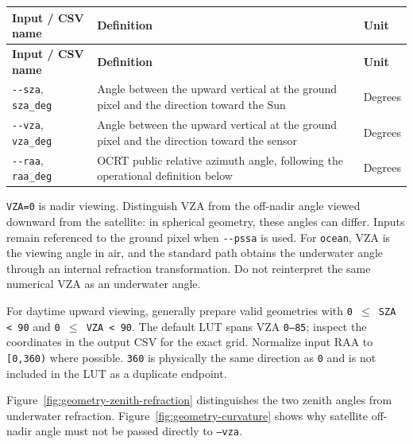 {\TableFont
\begin{longtable}{@{}>{\raggedright\arraybackslash}p{}>{\raggedright\arraybackslash}p{}>{\raggedright\arraybackslash}p{}@{}}
\toprule
\textbf{Input / CSV name} & \textbf{Definition} & \textbf{Unit} \\
\midrule
\endfirsthead
\toprule
\textbf{Input / CSV name} & \textbf{Definition} & \textbf{Unit} \\
\midrule
\endhead
\bottomrule
\endfoot
\texttt{-\allowbreak{}-\allowbreak{}sza}, \texttt{sza\_\allowbreak{}deg} & Angle between the upward vertical at the ground pixel and the direction toward the Sun & Degrees \\
\texttt{-\allowbreak{}-\allowbreak{}vza}, \texttt{vza\_\allowbreak{}deg} & Angle between the upward vertical at the ground pixel and the direction toward the sensor & Degrees \\
\texttt{-\allowbreak{}-\allowbreak{}raa}, \texttt{raa\_\allowbreak{}deg} & OCRT public relative azimuth angle, following the operational definition below & Degrees \\
\end{longtable}
}

\texttt{VZA=\allowbreak{}0\textdegree{}} is nadir viewing. Distinguish VZA from the off-nadir angle viewed downward from the satellite: in spherical geometry, these angles can differ. Inputs remain referenced to the ground pixel when \texttt{-\allowbreak{}-\allowbreak{}pssa} is used. For \texttt{ocean}, VZA is the viewing angle in air, and the standard path obtains the underwater angle through an internal refraction transformation. Do not reinterpret the same numerical VZA as an underwater angle.

For daytime upward viewing, generally prepare valid geometries with \texttt{0 \ensuremath{\leq} SZA < 90} and \texttt{0 \ensuremath{\leq} VZA < 90}. The default LUT spans VZA \texttt{0--85\textdegree{}}; inspect the coordinates in the output CSV for the exact grid. Normalize input RAA to \texttt{[0,\allowbreak{}360)} where possible. \texttt{360\textdegree{}} is physically the same direction as \texttt{0\textdegree{}} and is not included in the LUT as a duplicate endpoint.

Figure~\ref{fig:geometry-zenith-refraction} distinguishes the two zenith angles from underwater refraction. Figure~\ref{fig:geometry-curvature} shows why satellite off-nadir angle must not be passed directly to \texttt{--vza}.

